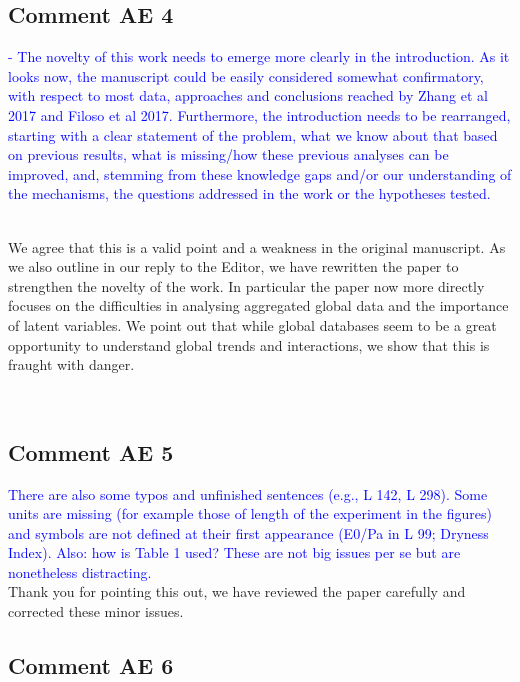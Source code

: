 \documentclass[]{elsarticle} %
\begin{document}
\hypertarget{comment-ae-4}{%
\subsection{Comment AE 4}\label{comment-ae-4}}

\textcolor{blue}{- The novelty of this work needs to emerge more clearly in the introduction. As it looks now, the manuscript could be easily considered somewhat confirmatory, with respect to most data, approaches and conclusions reached by Zhang et al 2017 and Filoso et al 2017. Furthermore, the introduction needs to be rearranged, starting with a clear statement of the problem, what we know about that based on previous results, what is missing/how these previous analyses can be improved, and, stemming from these knowledge gaps and/or our understanding of the mechanisms, the questions addressed in the work or the hypotheses tested.}\\
\strut \\
We agree that this is a valid point and a weakness in the original manuscript. As we also outline in our reply to the Editor, we have rewritten the paper to strengthen the novelty of the work. In particular the paper now more directly focuses on the difficulties in analysing aggregated global data and the importance of latent variables. We point out that while global databases seem to be a great opportunity to understand global trends and interactions, we show that this is fraught with danger.\\
\strut \\

\hypertarget{comment-ae-5}{%
\subsection{Comment AE 5}\label{comment-ae-5}}

\textcolor{blue}{There are also some typos and unfinished sentences (e.g., L 142, L 298). Some units are missing (for example those of length of the experiment in the figures) and symbols are not defined at their first appearance (E0/Pa in L 99; Dryness Index). Also: how is Table 1 used? These are not big issues per se but are nonetheless distracting.}\\
Thank you for pointing this out, we have reviewed the paper carefully and corrected these minor issues.

\hypertarget{comment-ae-6}{%
\subsection{Comment AE 6}\label{comment-ae-6}}
\end{document}
